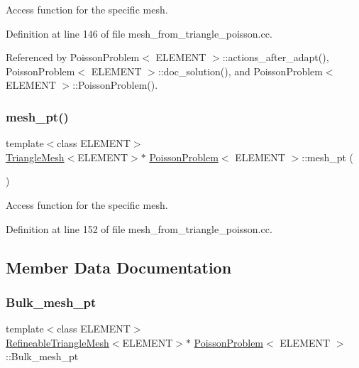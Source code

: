 Access function for the specific mesh. 



Definition at line 146 of file mesh\+\_\+from\+\_\+triangle\+\_\+poisson.\+cc.



Referenced by Poisson\+Problem$<$ E\+L\+E\+M\+E\+N\+T $>$\+::actions\+\_\+after\+\_\+adapt(), Poisson\+Problem$<$ E\+L\+E\+M\+E\+N\+T $>$\+::doc\+\_\+solution(), and Poisson\+Problem$<$ E\+L\+E\+M\+E\+N\+T $>$\+::\+Poisson\+Problem().

\mbox{\label{classPoissonProblem_ad428aa9392108f968db64534fc23ba86}} 
\subsubsection{\texorpdfstring{mesh\+\_\+pt()}{mesh\_pt()}\hspace{0.1cm}{\footnotesize\ttfamily [2/2]}}
{\footnotesize\ttfamily template$<$class E\+L\+E\+M\+E\+NT$>$ \\
\hyperlink{classoomph_1_1TriangleMesh}{Triangle\+Mesh}$<$E\+L\+E\+M\+E\+NT$>$$\ast$ \hyperlink{classPoissonProblem}{Poisson\+Problem}$<$ E\+L\+E\+M\+E\+NT $>$\+::mesh\+\_\+pt (\begin{DoxyParamCaption}{ }\end{DoxyParamCaption})\hspace{0.3cm}{\ttfamily [inline]}}



Access function for the specific mesh. 



Definition at line 152 of file mesh\+\_\+from\+\_\+triangle\+\_\+poisson.\+cc.



\subsection{Member Data Documentation}
\mbox{\label{classPoissonProblem_a4f4561d2155399268d45b2f86a61389a}} 
\subsubsection{\texorpdfstring{Bulk\+\_\+mesh\+\_\+pt}{Bulk\_mesh\_pt}}
{\footnotesize\ttfamily template$<$class E\+L\+E\+M\+E\+NT$>$ \\
\hyperlink{classoomph_1_1RefineableTriangleMesh}{Refineable\+Triangle\+Mesh}$<$E\+L\+E\+M\+E\+NT$>$$\ast$ \hyperlink{classPoissonProblem}{Poisson\+Problem}$<$ E\+L\+E\+M\+E\+NT $>$\+::Bulk\+\_\+mesh\+\_\+pt\hspace{0.3cm}{\ttfamily [private]}}



